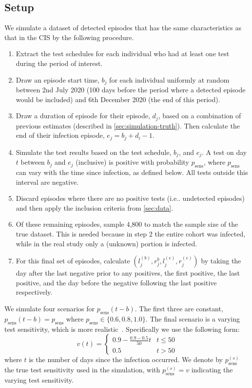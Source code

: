 \documentclass[12pt]{article}
\makeatletter
\newcommand{\psens}{p_\text{sens}}
\newcommand{\psenss}{p_\text{sens}^{(s)}}
\DeclareRobustCommand\onedot{\futurelet\@let@token\@onedot}
\def\@onedot{\ifx\@let@token.\else.\null\fi\xspace}
\def\ie{i.e\onedot} \def\Ie{{I.e}\onedot}
\makeatother
\begin{document}
\subsection{Setup}

We simulate a dataset of detected episodes that has the same characteristics as that in the CIS by the following procedure.
\begin{enumerate}
    \item Extract the test schedules for each individual who had at least one test during the period of interest.
    \item Draw an episode start time, $b_{j}$ for each individual uniformly at random between 2nd July 2020 (100 days before the period where a detected episode would be included) and 6th December 2020 (the end of this period).
    \item Draw a duration of episode for their episode, $d_j$, based on a combination of previous estimates (described in \cref{sec:simulation-truth}). Then calculate the end of their infection episode, $e_{j} = b_{j} + d_i - 1$.
    \item Simulate the test results based on the test schedule, $b_{j}$, and $e_{j}$. A test on day $t$ between $b_{j}$ and $e_{j}$ (inclusive) is positive with probability $\psens$, where $\psens$ can vary with the time since infection, as defined below. All tests outside this interval are negative.
    \item Discard episodes where there are no positive tests (\ie undetected episodes) and then apply the inclusion criteria from \cref{sec:data}.
    \item Of these remaining episodes, sample 4,800 to match the sample size of the true dataset. This is needed because in step 2 the entire cohort was infected, while in the real study only a (unknown) portion is infected.
    \item For this final set of episodes, calculate $(l_j^{(b)}, r_j^{b}, l_j^{(e)}, r_j^{(e)})$ by taking the day after the last negative prior to any positives, the first positive, the last positive, and the day before the negative following the last positive respectively.
\end{enumerate}

We simulate four scenarios for $\psens(t - b)$.
The first three are constant, $\psens(t-b) = \psens$ where $\psens \in \{ 0.6, 0.8, 1.0 \}$.
The final scenario is a varying test sensitivity, which is more realistic~\citep{blakeThesis}.
Specifically we use the following form:
\begin{equation}
  v(t) = \begin{cases}
    0.9 - \frac{0.9-0.5}{50}t &t \leq 50 \\
    0.5 &t > 50
  \end{cases}
  \label{imperf-test:eq:variable-test-sensitivity}
\end{equation}
where $t$ is the number of days since the infection occurred.
We denote by $\psenss$ the true test sensitivity used in the simulation, with $\psenss = v$ indicating the varying test sensitivity.
\end{document}
